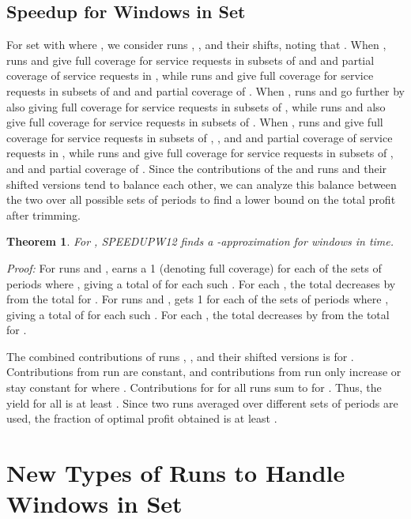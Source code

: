 \documentclass[11pt]{article}
\newtheorem{theorem}{Theorem}[section]
\newcommand\QED{\ifhmode\allowbreak\else\nobreak\fi
\quad\nobreak\medbreak}
\newcommand{\proofstart}{\par\noindent \emph{Proof:} }
\newcommand{\proofend}{\QED\par}
\newenvironment{proof}{\proofstart}{\proofend}
\begin{document}
\subsection{Speedup  for Windows in Set }

For set  with  where , we consider runs , , and their shifts, noting that .
When , runs  and  give full coverage for service requests in subsets of  and  and partial coverage of service requests in , while runs  and  give full coverage for service requests in subsets of  and  and partial coverage of .  When , runs  and  go further by also giving full coverage for service requests in subsets of , while runs  and  also give full coverage for service requests in subsets of .  When , runs  and  give full coverage for service requests in subsets of , , and  and partial coverage of service requests in , while runs  and  give full coverage for service requests in subsets of ,  and  and partial coverage of .  Since the contributions of the  and  runs and their shifted versions tend to balance each other, we can analyze this balance between the two over all possible sets of periods to find a lower bound on the total profit after trimming.

\begin{theorem}
For , SPEEDUPW12 finds a -approximation for windows  in  time.
\end{theorem}

\begin{proof}
For runs  and ,  earns a 1 (denoting full coverage) for each of the  sets of periods where , giving a total of  for each such .  For each , the total decreases by  from the total for .   For runs  and ,  gets 1 for each of the  sets of periods where , giving a total of  for each such .  For each , the total decreases by  from the total for .

The combined contributions of runs , , and their shifted versions is  for .  Contributions from run  are constant, and contributions from run  only increase or stay constant for  where .  Contributions for  for all runs sum to  for .  Thus, the yield for all  is at least .  Since two runs averaged over  different sets of periods are used, the fraction of optimal profit obtained is at least .
\end{proof}


\section{New Types of Runs to Handle Windows in Set }
\label{section:runs for W_3}
\end{document}
